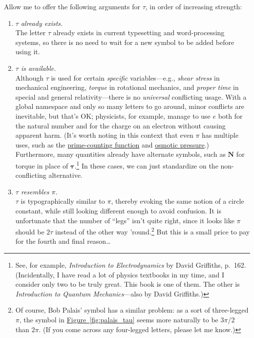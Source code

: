 \documentclass{article}
\begin{document}
Allow me to offer the following arguments for $\tau$, in order of increasing strength:

\begin{enumerate}
  
  \item \emph{$\tau$ already exists.} \\ The letter $\tau$ already exists in current typesetting and word-processing systems, so there is no need to wait for a new symbol to be added before using it.
  
  \item \emph{$\tau$ is available.} \\ Although $\tau$ is used for certain \emph{specific} variables---e.g., \emph{shear stress} in mechanical engineering, \emph{torque} in rotational mechanics, and \emph{proper time} in special and general relativity---there is no \emph{universal} conflicting usage. With a global namespace and only so many letters to go around, minor conflicts are inevitable, but that's OK; physicists, for example, manage to use $e$ both for the natural number and for the charge on an electron without causing apparent harm. (It's worth noting in this context that even $\pi$ has multiple uses, such as the \href{http://mathworld.wolfram.com/PrimeCountingFunction.html}{prime-counting function} and \href{http://www.chem.purdue.edu/gchelp/howtosolveit/Solutions/osmoticpressure.html}{osmotic pressure}.) Furthermore, many quantities already have alternate symbols, such as $\mathbf{N}$ for torque in place of $\boldsymbol{\tau}$.\footnote{See, for example, \emph{Introduction to Electrodynamics} by David Griffiths, p.~162. (Incidentally, I have read a lot of physics textbooks in my time, and I consider only two to be truly great. This book is one of them. The other is \emph{Introduction to Quantum Mechanics}---also by David Griffiths.)} In these cases, we can just standardize on the non-conflicting alternative. 
  
  \item \emph{$\tau$ resembles $\pi$.} \\ $\tau$ is typographically similar to $\pi$, thereby evoking the same notion of a circle constant, while still looking different enough to avoid confusion. It is unfortunate that the number of ``legs'' isn't quite right, since it looks like $\pi$ should be $2\tau$ instead of the other way 'round.\footnote{Of course, Bob Palais' symbol has a similar problem: as a sort of three-legged $\pi$, the symbol in \hyperref[fig:palais_tau]{Figure~}\ref{fig:palais_tau} seems more naturally to be $3\pi$/$2$ than $2\pi$. (If you come across any four-legged letters, please let me know.)} But this is a small price to pay for the fourth and final reason\ldots
%
  

\end{enumerate}
\end{document}
